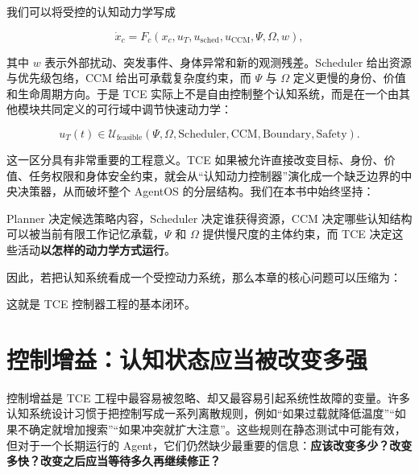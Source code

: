 我们可以将受控的认知动力学写成

\[
\dot x_c
=
F_c
\left(
x_c,
u_T,
u_{\mathrm{sched}},
u_{\mathrm{CCM}},
\Psi,
\Omega,
w
\right),
\]

其中 $w$ 表示外部扰动、突发事件、身体异常和新的观测残差。Scheduler 给出资源与优先级包络，CCM 给出可承载复杂度约束，而 $\Psi$ 与 $\Omega$ 定义更慢的身份、价值和生命周期方向。于是 TCE 实际上不是自由控制整个认知系统，而是在一个由其他模块共同定义的可行域中调节快速动力学：

\[
u_T(t)
\in
\mathcal U_{\mathrm{feasible}}
\left(
\Psi,
\Omega,
\mathrm{Scheduler},
\mathrm{CCM},
\mathrm{Boundary},
\mathrm{Safety}
\right).
\]

这一区分具有非常重要的工程意义。TCE 如果被允许直接改变目标、身份、价值、任务权限和身体安全约束，就会从“认知动力控制器”演化成一个缺乏边界的中央决策器，从而破坏整个 AgentOS 的分层结构。我们在本书中始终坚持：

\begin{statementbox}
\centering
{}
\end{statementbox}

Planner 决定候选策略内容，Scheduler 决定谁获得资源，CCM 决定哪些认知结构可以被当前有限工作记忆承载，$\Psi$ 和 $\Omega$ 提供慢尺度的主体约束，而 TCE 决定这些活动\textbf{以怎样的动力学方式运行}。

因此，若把认知系统看成一个受控动力系统，那么本章的核心问题可以压缩为：

\begin{statementbox}
\centering
{}
\end{statementbox}

这就是 TCE 控制器工程的基本闭环。

\section{控制增益：认知状态应当被改变多强}

控制增益是 TCE 工程中最容易被忽略、却又最容易引起系统性故障的变量。许多认知系统设计习惯于把控制写成一系列离散规则，例如“如果过载就降低温度”“如果不确定就增加搜索”“如果冲突就扩大注意”。这些规则在静态测试中可能有效，但对于一个长期运行的 Agent，它们仍然缺少最重要的信息：\textbf{应该改变多少？改变多快？改变之后应当等待多久再继续修正？}

